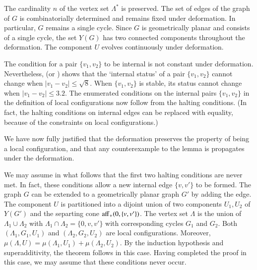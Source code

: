 The cardinality $n$ of the vertex set $\Lambda^*$ is preserved.
The set of edges of the graph of $G$ is combinatorially determined and
remains fixed under deformation.  In particular, $G$ remains a single
cycle.  Since $G$ is geometrically planar and consists of a single
cycle, the set $Y(G)$ has two connected components throughout the
deformation.  The component $U$ evolves continuously under deformation.   

The condition for a pair $\{v_1,v_2\}$ to be
internal is not constant under deformation.  Nevertheless,
\cite[p.23]{arx} (or \cite[p.132]{DCG}) 
shows that the `internal status' of a pair $\{v_1,v_2\}$
cannot change when $|v_1-v_2| \le \sqrt8$.  When $\{v_1,v_2\}$ is stable,
its status cannot change when $|v_1-v_2|\le 3.2$. 
The enumerated conditions on the
internal pairs $\{v_1,v_2\}$ in the definition of local configurations
now follow from the halting conditions. (In fact, the halting conditions on internal edges
can be replaced with equality, because of the
constraints on local configurations.)

We have now fully justified that the deformation preserves
the property of being a local configuration, and that
any counterexample to the lemma is propagates under
the deformation.

\smallskip

We may assume in what follows that the first two halting conditions are never
met.  In fact, these conditions allow a new internal edge $\{v,v'\}$ to be formed.  The
graph $G$ can be extended to a geometrically planar graph $G'$ by adding the edge.
The component $U$ is partitioned into a dijoint union of two components $U_1,U_2$ 
of $Y(G')$ and the separting cone ${\operatorname{aff}}_+(0,\{v,v'\})$.  The vertex set
$\Lambda$ is the union of $\Lambda_1\cup\Lambda_2$ with $\Lambda_1\cap\Lambda_2=\{0,v,v'\}$
with corresponding cycles $G_1$ and $G_2$.  Both $(\Lambda_1,G_1,U_1)$ and $(\Lambda_2,G_2,U_2)$ are local configurations.  Moreover, $\mu(\Lambda,U) = \mu(\Lambda_1,U_1)+\mu(\Lambda_2,U_2)$.  By the induction hypothesis and superadditivity, the theorem follows in this case.
Having completed the proof in this case, we may assume that these conditions never occur.

